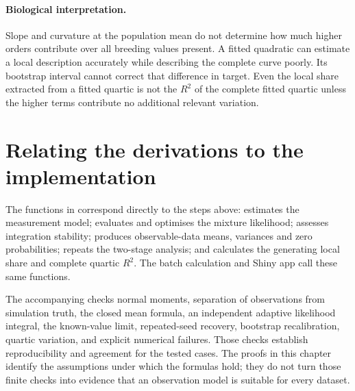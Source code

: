 \paragraph{Biological interpretation.}
Slope and curvature at the population mean do not determine how much higher
orders contribute over all breeding values present. A fitted quadratic can
estimate a local description accurately while describing the complete curve
poorly. Its bootstrap interval cannot correct that difference in target.
Even the local share extracted from a fitted quartic is not the \(R^2\) of
the complete fitted quartic unless the higher terms contribute no additional
relevant variation.

\section{Relating the derivations to the implementation}

The functions in
correspond directly to the steps above:
 estimates the measurement model;
 evaluates and optimises the mixture likelihood;
 assesses integration stability;
 produces observable-data means, variances and
zero probabilities;  repeats the two-stage analysis; and
 calculates the generating local share and complete quartic
\(R^2\). The batch calculation and Shiny app call these same functions.

The accompanying  checks normal moments, separation of
observations from simulation truth, the closed mean formula, an independent
adaptive likelihood integral, the known-value limit, repeated-seed recovery,
bootstrap recalibration, quartic variation, and explicit numerical failures.
Those checks establish reproducibility and agreement for the tested cases.
The proofs in this chapter identify the assumptions under which the formulas
hold; they do not turn those finite checks into evidence that an observation
model is suitable for every dataset.
